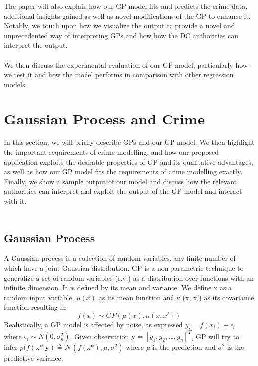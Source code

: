 \documentclass[letterpaper]{article}
\begin{document}
	The paper will also explain how our GP model fits and predicts the crime data, additional insights gained as well as novel modifications of the GP to enhance it. 
	Notably, we touch upon how we visualize the output to provide a novel and unprecedented way of interpreting GPs and how how the DC authorities can interpret the output.\\ \\

	We then discuss the experimental evaluation of our GP model, particularly how we test it and how the model performs in comparison with other regression models. 
	
	\section{Gaussian Process and Crime}

	In this section, we will briefly describe GPs and our GP model. We then highlight the important requirements of crime modelling, and how our proposed application exploits the desirable properties of GP and its qualitative advantages, as well as how our GP model fits the requirements of crime modelling exactly. 
	Finally, we show a sample output of our model and discuss how the relevant authorities can interpret and exploit the output of the GP model and interact with it.\\ \\

	\subsection{Gaussian Process}
	
	A Gaussian process is a collection of random variables, any finite number of which have a joint Gaussian distribution.
	GP is a non-parametric technique to generalize a set of random variables (r.v.) as a distribution over functions with an infinite dimension. \cite{1}
	It is defined by its mean and variance. We define x as a random input variable, $\mu (x)$ as its mean function and $\kappa$ (x, x') as its covariance function resulting in \[f(x) \sim GP(\mu (x), \kappa (x, x')) \]
	Realistically, a GP model is affected by noise, as expressed $y_i = f(x_i) + \epsilon_i$ where $\epsilon_i \sim N(0, \sigma^2_n)$.
	Given observation $\mathbf{y} = [y_1, y_2, \ldots, y_n]^T$, GP will try to infer  $ p(f(\text{x*} | \textbf{y}) \triangleq \mathcal{N}(f(\text{x*}); \mu, \sigma^2)$ where $\mu$ is the prediction and $\sigma^2$ is the predictive variance. 
	
\end{document}
